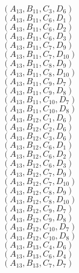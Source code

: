 \documentclass[14pt]{article}
\begin{document}
    $({A}_{13}, {B}_{11}, {C}_{3}, {D}_{6}) $ \\ 
    $({A}_{13}, {B}_{11}, {C}_{6}, {D}_{1}) $ \\ 
    $({A}_{13}, {B}_{11}, {C}_{6}, {D}_{2}) $ \\ 
    $({A}_{13}, {B}_{11}, {C}_{6}, {D}_{3}) $ \\ 
    $({A}_{13}, {B}_{11}, {C}_{7}, {D}_{9}) $ \\ 
    $({A}_{13}, {B}_{11}, {C}_{7}, {D}_{10}) $ \\ 
    $({A}_{13}, {B}_{11}, {C}_{8}, {D}_{9}) $ \\ 
    $({A}_{13}, {B}_{11}, {C}_{8}, {D}_{10}) $ \\ 
    $({A}_{13}, {B}_{11}, {C}_{9}, {D}_{7}) $ \\ 
    $({A}_{13}, {B}_{11}, {C}_{9}, {D}_{8}) $ \\ 
    $({A}_{13}, {B}_{11}, {C}_{10}, {D}_{7}) $ \\ 
    $({A}_{13}, {B}_{11}, {C}_{10}, {D}_{8}) $ \\ 
    $({A}_{13}, {B}_{12}, {C}_{1}, {D}_{6}) $ \\ 
    $({A}_{13}, {B}_{12}, {C}_{2}, {D}_{6}) $ \\ 
    $({A}_{13}, {B}_{12}, {C}_{3}, {D}_{6}) $ \\ 
    $({A}_{13}, {B}_{12}, {C}_{6}, {D}_{1}) $ \\ 
    $({A}_{13}, {B}_{12}, {C}_{6}, {D}_{2}) $ \\ 
    $({A}_{13}, {B}_{12}, {C}_{6}, {D}_{3}) $ \\ 
    $({A}_{13}, {B}_{12}, {C}_{7}, {D}_{9}) $ \\ 
    $({A}_{13}, {B}_{12}, {C}_{7}, {D}_{10}) $ \\ 
    $({A}_{13}, {B}_{12}, {C}_{8}, {D}_{9}) $ \\ 
    $({A}_{13}, {B}_{12}, {C}_{8}, {D}_{10}) $ \\ 
    $({A}_{13}, {B}_{12}, {C}_{9}, {D}_{7}) $ \\ 
    $({A}_{13}, {B}_{12}, {C}_{9}, {D}_{8}) $ \\ 
    $({A}_{13}, {B}_{12}, {C}_{10}, {D}_{7}) $ \\ 
    $({A}_{13}, {B}_{12}, {C}_{10}, {D}_{8}) $ \\ 
    $({A}_{13}, {B}_{13}, {C}_{4}, {D}_{6}) $ \\ 
    $({A}_{13}, {B}_{13}, {C}_{6}, {D}_{4}) $ \\ 
    $({A}_{13}, {B}_{13}, {C}_{7}, {D}_{7}) $ \\ 
\end{document}
